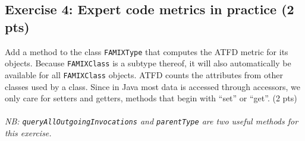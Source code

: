 \documentclass [11pt, a4wide, twoside]{article}
\begin{document}
\subsection*{Exercise 4: Expert code metrics in practice (2 pts)}
Add a method to the class \texttt{FAMIXType} that computes the ATFD metric for its objects. Because \texttt{FAMIXClass} is a subtype thereof, it will also automatically be available for all \texttt{FAMIXClass} objects. ATFD counts the attributes from other classes used by a class. Since in Java most data is accessed through accessors, we only care for setters and getters, \ie methods that begin with ``set'' or ``get''. (2 pts)\\\\
\emph{NB: \texttt{queryAllOutgoingInvocations} and \texttt{parentType} are two useful methods for this exercise.}
\end{document}

